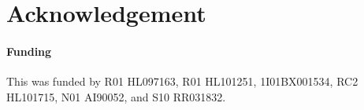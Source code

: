 \documentclass{bioinfo}
\begin{document}
\section*{Acknowledgement}

\paragraph{Funding\textcolon} This was funded by R01 HL097163, R01 HL101251, 1I01BX001534, RC2 HL101715, N01 AI90052, and S10 RR031832.

%
%
%
%
%
%
%
%
%



    
\end{document}

